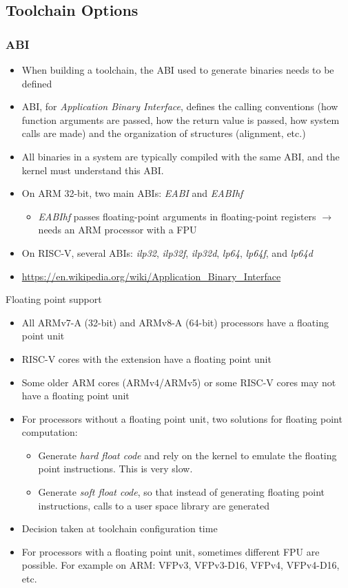 \subsection{Toolchain Options}
\begin{frame}
  \frametitle{ABI}
  \begin{itemize}
  \item When building a toolchain, the ABI used to generate binaries
    needs to be defined
  \item ABI, for {\em Application Binary Interface}, defines the
    calling conventions (how function arguments are passed, how the
    return value is passed, how system calls are made) and the
    organization of structures (alignment, etc.)
  \item All binaries in a system are typically compiled with the same ABI,
    and the kernel must understand this ABI.
  \item On ARM 32-bit, two main ABIs: {\em EABI} and {\em EABIhf}
    \begin{itemize}
    \item {\em EABIhf} passes floating-point arguments in
      floating-point registers $\rightarrow$ needs an ARM processor
      with a FPU
    \end{itemize}
  \item On RISC-V, several ABIs: {\em ilp32}, {\em ilp32f}, {\em ilp32d},
        {\em lp64}, {\em lp64f}, and {\em lp64d}
  \item {\fontsize{10}{15} \url{https://en.wikipedia.org/wiki/Application_Binary_Interface}}
  \end{itemize}
\end{frame}

\begin{frame}{Floating point support}
  \begin{itemize}
  \item All ARMv7-A (32-bit) and ARMv8-A (64-bit) processors have a
    floating point unit
  \item RISC-V cores with the  extension have a floating point
    unit
  \item Some older ARM cores (ARMv4/ARMv5) or some RISC-V cores may
    not have a floating point unit
  \item For processors without a floating point unit, two solutions
    for floating point computation:
    \begin{itemize}
    \item Generate {\em hard float code} and rely on the kernel to
      emulate the floating point instructions. This is very slow.
    \item Generate {\em soft float code}, so that instead of
      generating floating point instructions, calls to a user space
      library are generated
    \end{itemize}
  \item Decision taken at toolchain configuration time
  \item For processors with a floating point unit, sometimes different
    FPU are possible. For example on ARM: VFPv3, VFPv3-D16, VFPv4,
    VFPv4-D16, etc.
  \end{itemize}
\end{frame}

